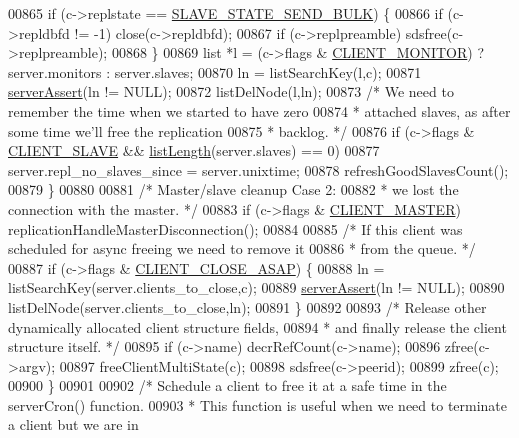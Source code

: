 \begin{DoxyCode}
{{{{{{{{{{00865         \textcolor{keywordflow}{if} (c->replstate == \hyperlink{server_8h_ada38427ad2d0c09875081868a53cc51f}{SLAVE\_STATE\_SEND\_BULK}) \{
00866             \textcolor{keywordflow}{if} (c->repldbfd != -1) close(c->repldbfd);
00867             \textcolor{keywordflow}{if} (c->replpreamble) sdsfree(c->replpreamble);
00868         \}
00869         list *l = (c->flags & \hyperlink{server_8h_a7724350e4f0ddbf1c80740699fac78be}{CLIENT\_MONITOR}) ? server.monitors : server.slaves;
00870         ln = listSearchKey(l,c);
00871         \hyperlink{server_8h_a88114b5169b4c382df6b56506285e56a}{serverAssert}(ln != NULL);
00872         listDelNode(l,ln);
00873         \textcolor{comment}{/* We need to remember the time when we started to have zero}
00874 \textcolor{comment}{         * attached slaves, as after some time we'll free the replication}
00875 \textcolor{comment}{         * backlog. */}
00876         \textcolor{keywordflow}{if} (c->flags & \hyperlink{server_8h_ae9f6995948253652bc9454d79a72f4a7}{CLIENT\_SLAVE} && \hyperlink{adlist_8h_afde0ab079f934670e82119b43120e94b}{listLength}(server.slaves) == 0)
00877             server.repl\_no\_slaves\_since = server.unixtime;
00878         refreshGoodSlavesCount();
00879     \}
00880 
00881     \textcolor{comment}{/* Master/slave cleanup Case 2:}
00882 \textcolor{comment}{     * we lost the connection with the master. */}
00883     \textcolor{keywordflow}{if} (c->flags & \hyperlink{server_8h_a3d8f0cc8d0653ee2b6dafb454292c069}{CLIENT\_MASTER}) replicationHandleMasterDisconnection();
00884 
00885     \textcolor{comment}{/* If this client was scheduled for async freeing we need to remove it}
00886 \textcolor{comment}{     * from the queue. */}
00887     \textcolor{keywordflow}{if} (c->flags & \hyperlink{server_8h_ad6690c6231b67525b8b2057e092a8361}{CLIENT\_CLOSE\_ASAP}) \{
00888         ln = listSearchKey(server.clients\_to\_close,c);
00889         \hyperlink{server_8h_a88114b5169b4c382df6b56506285e56a}{serverAssert}(ln != NULL);
00890         listDelNode(server.clients\_to\_close,ln);
00891     \}
00892 
00893     \textcolor{comment}{/* Release other dynamically allocated client structure fields,}
00894 \textcolor{comment}{     * and finally release the client structure itself. */}
00895     \textcolor{keywordflow}{if} (c->name) decrRefCount(c->name);
00896     zfree(c->argv);
00897     freeClientMultiState(c);
00898     sdsfree(c->peerid);
00899     zfree(c);
00900 \}
00901 
00902 \textcolor{comment}{/* Schedule a client to free it at a safe time in the serverCron() function.}
00903 \textcolor{comment}{ * This function is useful when we need to terminate a client but we are in}
}}}}}}}}}}
\end{DoxyCode}
